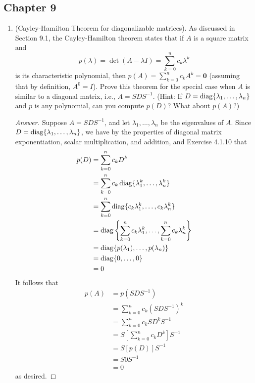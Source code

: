 \documentclass[../psets.tex]{subfiles}
\begin{document}
\subsection*{Chapter 9}
\begin{enumerate}[label={\textbf{1.\arabic*.}}]
    \item (Cayley-Hamilton Theorem for diagonalizable matrices). As discussed in Section 9.1, the Cayley-Hamilton theorem states that if $A$ is a square matrix and
    \begin{equation*}
        p(\lambda) = \det(A-\lambda I) = \sum_{k=0}^nc_k\lambda^k
    \end{equation*}
    is its characteristic polynomial, then $p(A)=\sum_{k=0}^nc_kA^k=\bm{0}$ (assuming that by definition, $A^0=I$). Prove this theorem for the special case when $A$ is similar to a diagonal matrix, i.e., $A=SDS^{-1}$. (Hint: If $D=\operatorname{diag}\{\lambda_1,\dots,\lambda_n\}$ and $p$ is any polynomial, can you compute $p(D)$? What about $p(A)$?)
    \begin{proof}[Answer]
        Suppose $A=SDS^{-1}$, and let $\lambda_1,\dots,\lambda_n$ be the eigenvalues of $A$. Since $D=\operatorname{diag}\{\lambda_1,\dots,\lambda_n\}$, we have by the properties of diagonal matrix exponentiation, scalar multiplication, and addition, and Exercise 4.1.10 that
        \begin{align*}
            p(D) &= \sum_{k=0}^nc_kD^k\\
            &= \sum_{k=0}^nc_k\operatorname{diag}\{\lambda_1^k,\dots,\lambda_n^k\}\\
            &= \sum_{k=0}^n\operatorname{diag}\{c_k\lambda_1^k,\dots,c_k\lambda_n^k\}\\
            &= \operatorname{diag}\left\{ \sum_{k=0}^nc_k\lambda_1^k,\dots,\sum_{k=0}^nc_k\lambda_n^k \right\}\\
            &= \operatorname{diag}\{p(\lambda_1),\dots,p(\lambda_n)\}\\
            &= \operatorname{diag}\{0,\dots,0\}\\
            &= 0
        \end{align*}
        It follows that
        \begin{align*}
            p(A) &= p(SDS^{-1})\\
            &= \sum_{k=0}^nc_k(SDS^{-1})^k\\
            &= \sum_{k=0}^nc_kSD^kS^{-1}\\
            &= S\left[ \sum_{k=0}^nc_kD^k \right]S^{-1}\\
            &= S[p(D)]S^{-1}\\
            &= S0S^{-1}\\
            &= 0
        \end{align*}
        as desired.
    \end{proof}
\end{enumerate}
\end{document}
